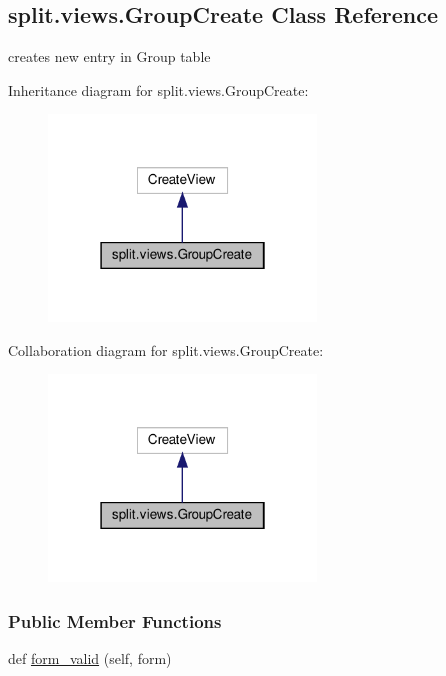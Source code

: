 \hypertarget{classsplit_1_1views_1_1GroupCreate}{}\subsection{split.\+views.\+Group\+Create Class Reference}
\label{classsplit_1_1views_1_1GroupCreate}


creates new entry in Group table  




Inheritance diagram for split.\+views.\+Group\+Create\+:\nopagebreak
\begin{figure}[H]
\begin{center}
\leavevmode
\includegraphics[width=202pt]{classsplit_1_1views_1_1GroupCreate__inherit__graph}
\end{center}
\end{figure}


Collaboration diagram for split.\+views.\+Group\+Create\+:\nopagebreak
\begin{figure}[H]
\begin{center}
\leavevmode
\includegraphics[width=202pt]{classsplit_1_1views_1_1GroupCreate__coll__graph}
\end{center}
\end{figure}
\subsubsection*{Public Member Functions}
\begin{DoxyCompactItemize}
\item 
def \hyperlink{classsplit_1_1views_1_1GroupCreate_a51d45719401432233422c7944d45f942}{form\+\_\+valid} (self, form)
\end{DoxyCompactItemize}
